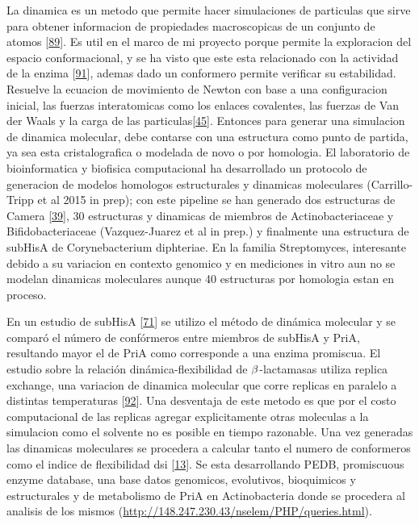 \documentclass[12pt,twoside]{reedthesis}
\begin{document}
  La dinamica es un metodo que permite hacer simulaciones de particulas
  que sirve para obtener informacion de propiedades macroscopicas de un
  conjunto de atomos
  {[}\protect\hyperlink{ref-petrenko_molecular_2001}{89}{]}. Es util en el
  marco de mi proyecto porque permite la exploracion del espacio
  conformacional, y se ha visto que este esta relacionado con la actividad
  de la enzima {[}\protect\hyperlink{ref-sikosek_biophysics_2014}{91}{]},
  ademas dado un conformero permite verificar su estabilidad. Resuelve la
  ecuacion de movimiento de Newton con base a una configuracion inicial,
  las fuerzas interatomicas como los enlaces covalentes, las fuerzas de
  Van der Waals y la carga de las
  particulas{[}\protect\hyperlink{ref-campbell_biophysical_2012}{45}{]}.
  Entonces para generar una simulacion de dinamica molecular, debe
  contarse con una estructura como punto de partida, ya sea esta
  cristalografica o modelada de novo o por homologia. El laboratorio de
  bioinformatica y biofisica computacional ha desarrollado un protocolo de
  generacion de modelos homologos estructurales y dinamicas moleculares
  (Carrillo-Tripp et al 2015 in prep); con este pipeline se han generado
  dos estructuras de Camera
  {[}\protect\hyperlink{ref-noda-garcia_insights_2015}{39}{]}, 30
  estructuras y dinamicas de miembros de Actinobacteriaceae y
  Bifidobacteriaceae (Vazquez-Juarez et al in prep.) y finalmente una
  estructura de subHisA de Corynebacterium diphteriae. En la familia
  Streptomyces, interesante debido a su variacion en contexto genomico y
  en mediciones in vitro aun no se modelan dinamicas moleculares aunque 40
  estructuras por homologia estan en proceso.
  
  En un estudio de subHisA
  {[}\protect\hyperlink{ref-noda_tesis_2012}{71}{]} se utilizo el método
  de dinámica molecular y se comparó el número de confórmeros entre
  miembros de subHisA y PriA, resultando mayor el de PriA como corresponde
  a una enzima promiscua. El estudio sobre la relación
  dinámica-flexibilidad de \(\noindent\beta\)-lactamasas utiliza replica
  exchange, una variacion de dinamica molecular que corre replicas en
  paralelo a distintas temperaturas
  {[}\protect\hyperlink{ref-bai_replica_2006}{92}{]}. Una desventaja de
  este metodo es que por el costo computacional de las replicas agregar
  explicitamente otras moleculas a la simulacion como el solvente no es
  posible en tiempo razonable. Una vez generadas las dinamicas moleculares
  se procedera a calcular tanto el numero de conformeros como el indice de
  flexibilidad dsi {[}\protect\hyperlink{ref-zou_evolution_2015}{13}{]}.
  Se esta desarrollando PEDB, promiscuous enzyme database, una base datos
  genomicos, evolutivos, bioquimicos y estructurales y de metabolismo de
  PriA en Actinobacteria donde se procedera al analisis de los mismos
  (\url{http://148.247.230.43/nselem/PHP/queries.html}).
  
\end{document}
